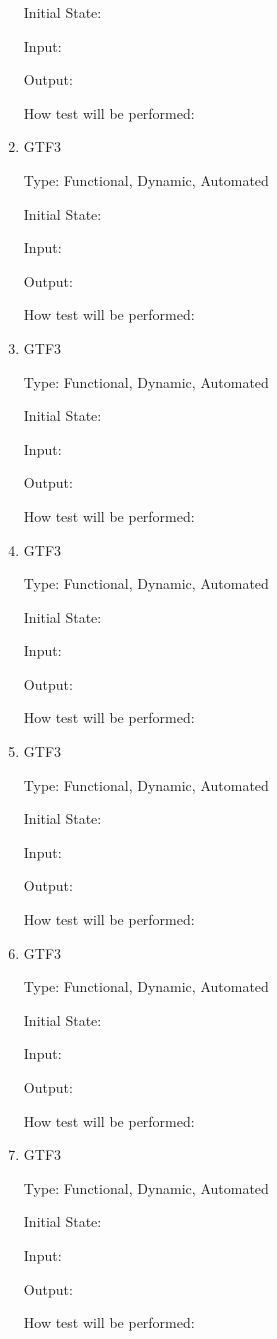 \documentclass[12pt, titlepage]{article}
\begin{document}
\begin{enumerate}
Initial State: 
					
Input: 
					
Output: 

How test will be performed: 

\item{GTF3\\}

Type: Functional, Dynamic, Automated
					
Initial State: 
					
Input: 
					
Output: 

How test will be performed: 

\item{GTF3\\}

Type: Functional, Dynamic, Automated
					
Initial State: 
					
Input: 
					
Output: 

How test will be performed: 

\item{GTF3\\}

Type: Functional, Dynamic, Automated
					
Initial State: 
					
Input: 
					
Output: 

How test will be performed: 

\item{GTF3\\}

Type: Functional, Dynamic, Automated
					
Initial State: 
					
Input: 
					
Output: 

How test will be performed: 

\item{GTF3\\}

Type: Functional, Dynamic, Automated
					
Initial State: 
					
Input: 
					
Output: 

How test will be performed: 

\item{GTF3\\}

Type: Functional, Dynamic, Automated
					
Initial State: 
					
Input: 
					
Output: 

How test will be performed: 


\end{enumerate}
\end{document}
